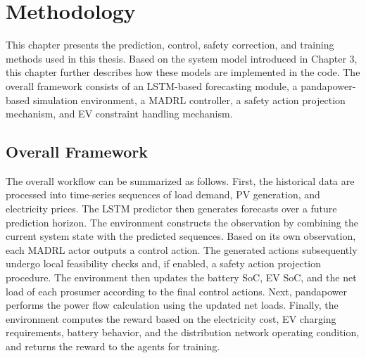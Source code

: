 
\chapter{Methodology}\label{chapter:methodology}

This chapter presents the prediction, control, safety correction, and training methods used in this thesis. Based on the system model introduced in Chapter 3, this chapter further describes how these models are implemented in the code. The overall framework consists of an LSTM-based forecasting module, a pandapower-based simulation environment, a MADRL controller, a safety action projection mechanism, and EV constraint handling mechanism.

\section{Overall Framework}

The overall workflow can be summarized as follows. First, the historical data are processed into time-series sequences of load demand, PV generation, and electricity prices. The LSTM predictor then generates forecasts over a future prediction horizon. The environment constructs the observation by combining the current system state with the predicted sequences. Based on its own observation, each MADRL actor outputs a control action. The generated actions subsequently undergo local feasibility checks and, if enabled, a safety action projection procedure. The environment then updates the battery SoC, EV SoC, and the net load of each prosumer according to the final control actions. Next, pandapower performs the power flow calculation using the updated net loads. Finally, the environment computes the reward based on the electricity cost, EV charging requirements, battery behavior, and the distribution network operating condition, and returns the reward to the agents for training.

